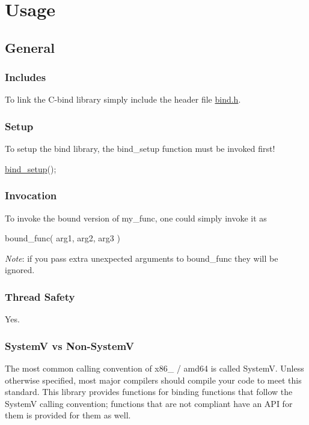 \section*{Usage}

\subsection*{General}

\subsubsection*{Includes}

To link the {\ttfamily C-\/bind} library simply include the header file {\ttfamily \hyperlink{bind_8h}{bind.\+h}}.

\subsubsection*{Setup}

To setup the bind library, the {\ttfamily bind\+\_\+setup} function must be invoked first! 
\begin{DoxyCode}
\hyperlink{bind_8c_a57d49e18c9326489d842187e2a1e0086}{bind\_setup}();
\end{DoxyCode}


\subsubsection*{Invocation}

To invoke the bound version of {\ttfamily my\+\_\+func}, one could simply invoke it as 
\begin{DoxyCode}
bound\_func( arg1, arg2, arg3 )
\end{DoxyCode}
 {\itshape Note}\+: if you pass extra unexpected arguments to {\ttfamily bound\+\_\+func} they will be ignored.

\subsubsection*{Thread Safety}

Yes.

\subsubsection*{SystemV vs Non-\/\+SystemV}

The most common calling convention of {\ttfamily x86\+\_} / {\ttfamily amd64} is called SystemV. Unless otherwise specified, most major compilers should compile your code to meet this standard. This library provides functions for binding functions that follow the SystemV calling convention; functions that are not compliant have an A\+PI for them is provided for them as well.

